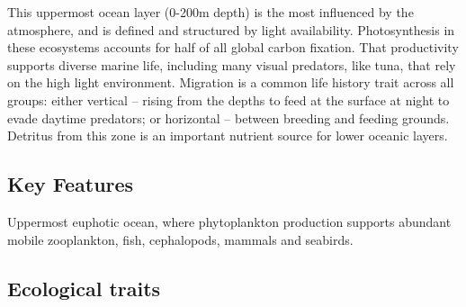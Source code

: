 \documentclass[
  letterpaper,
  DIV=11,
  numbers=noendperiod]{scrartcl}
\begin{document}
This uppermost ocean layer (0-200m depth) is the most influenced by the
atmosphere, and is defined and structured by light availability.
Photosynthesis in these ecosystems accounts for half of all global
carbon fixation. That productivity supports diverse marine life,
including many visual predators, like tuna, that rely on the high light
environment. Migration is a common life history trait across all groups:
either vertical -- rising from the depths to feed at the surface at
night to evade daytime predators; or horizontal -- between breeding and
feeding grounds. Detritus from this zone is an important nutrient source
for lower oceanic layers.

\subsection{Key Features}\label{key-features-35}

Uppermost euphotic ocean, where phytoplankton production supports
abundant mobile zooplankton, fish, cephalopods, mammals and seabirds.

\subsection{Ecological traits}\label{ecological-traits-35}
\end{document}
